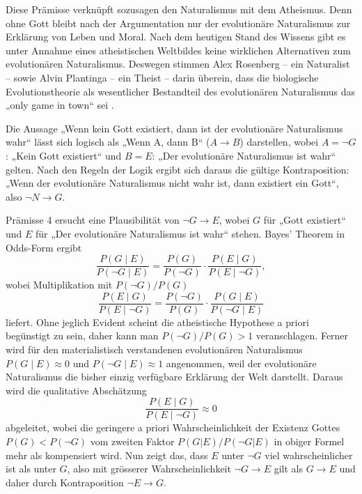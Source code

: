 \documentclass[11pt,a4paper]{article}
\begin{document}
	Diese Prämisse verknüpft sozusagen den Naturalismus mit dem Atheismus. Denn ohne Gott bleibt nach der Argumentation nur der evolutionäre Naturalismus zur Erklärung von Leben und Moral. Nach dem heutigen Stand des Wissens gibt es unter Annahme eines atheistischen Weltbildes keine wirklichen Alternativen zum evolutionären Naturalismus. Deswegen stimmen Alex Rosenberg – ein Naturalist – sowie Alvin Plantinga – ein Theist – darin überein, dass die biologische Evolutionstheorie als wesentlicher Bestandteil des evolutionären Naturalismus das „only game in town“ sei \cite[S.394]{linville}.
	
	Die Aussage „Wenn kein Gott existiert, dann ist der evolutionäre Naturalismus wahr“ lässt sich logisch als „Wenn A, dann B“ ($A\rightarrow B$) darstellen, wobei \(A = \neg G\): „Kein Gott existiert“ und \(B = E\): „Der evolutionäre Naturalismus ist wahr“ gelten. Nach den Regeln der Logik ergibt sich daraus die gültige Kontraposition: „Wenn der evolutionäre Naturalismus nicht wahr ist, dann existiert ein Gott“, also $\neg N \rightarrow G$.
	
	\begin{tcolorbox}[title=Mathematik-Box: Prämisse 4]
	Prämisse 4 ersucht eine Plausibilität von \(\neg G\rightarrow E\), wobei \(G\) für „Gott existiert“ und \(E\) für „Der evolutionäre Naturalismus ist wahr“ stehen. Bayes' Theorem in Odds-Form ergibt
		\[
		\frac{P(G\mid E)}{P(\neg G\mid E)}
		=
		\frac{P(G)}{P(\neg G)}
		\cdot
		\frac{P(E\mid G)}{P(E\mid\neg G)},
		\]
		wobei Multiplikation mit $P(\neg G)/P(G)$
		\[
		\frac{P(E\mid G)}{P(E\mid\neg G)}
		=
		\frac{P(\neg G)}{P(G)}
		\cdot
		\frac{P(G\mid E)}{P(\neg G\mid E)}
		\]
		liefert. Ohne jeglich Evident scheint die atheistische Hypothese a priori begünstigt zu sein, daher kann man \(P(\neg G)/P(G)> 1\) veranschlagen. Ferner wird für den materialistisch verstandenen evolutionären Naturalismus \(P(G\mid E)\approx 0\) und \(P(\neg G\mid E)\approx 1\) angenommen, weil der evolutionäre Naturalismus die bisher einzig verfügbare Erklärung der Welt darstellt. Daraus wird die qualitative Abschätzung
		\[
		\frac{P(E\mid G)}{P(E\mid\neg G)}\approx 0
		\]
		abgeleitet, wobei die geringere a priori Wahrscheinlichkeit der Existenz Gottes $P(G) < P(\neg G)$ vom zweiten Faktor $P(G|E) / P(\neg G|E)$ in obiger Formel mehr als kompensiert wird. Nun zeigt das, dass \(E\) unter \(\neg G\) viel wahrscheinlicher ist als unter \(G\), also mit grösserer Wahrscheinlichkeit $\neg G \rightarrow E$ gilt als $G \rightarrow E$ und daher durch Kontraposition $\neg E \rightarrow G$.
	\end{tcolorbox}
	
\end{document}
